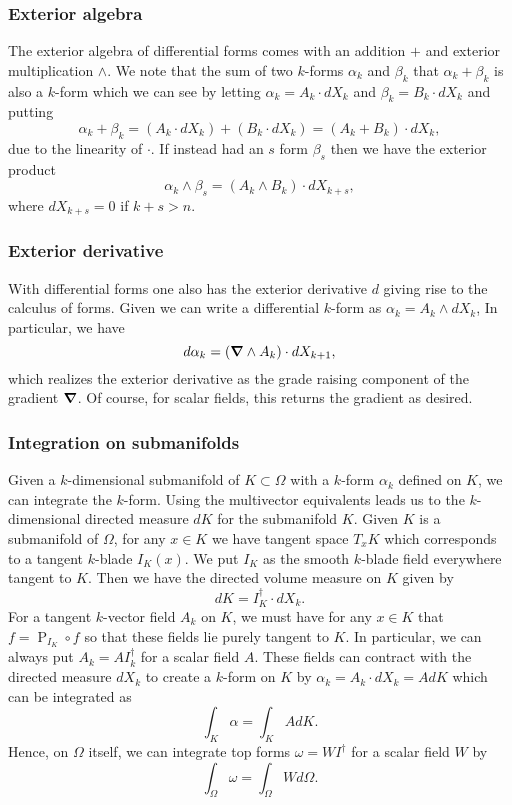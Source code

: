 \subsubsection{Exterior algebra}
The exterior algebra of differential forms comes with an addition $+$ and exterior multiplication $\wedge$.  We note that the sum of two $k$-forms $\alpha_k$ and $\beta_k$ that $\alpha_k+\beta_k$ is also a $k$-form which we can see by letting $\alpha_k = A_k \cdot dX_k$ and $\beta_k = B_k \cdot dX_k$ and putting
\[
\alpha_k + \beta_k = (A_k \cdot dX_k)+(B_k \cdot dX_k) = (A_k + B_k) \cdot dX_k,
\]
due to the linearity of $\cdot$.  If instead had an $s$ form $\beta_s$ then we have the exterior product
\[
\alpha_k \wedge \beta_s = (A_k \wedge B_k) \cdot dX_{k+s},
\]
where $dX_{k+s}=0$ if $k+s>n$.  


\subsubsection{Exterior derivative}
With differential forms one also has the exterior derivative $d$ giving rise to the calculus of forms.  Given we can write a differential $k$-form as $\alpha_k = A_k \wedge dX_k$,  In particular, we have
\[
d \alpha_k = (\boldsymbol{\nabla} \wedge A_k) \cdot dX_{k+1},
\]
which realizes the exterior derivative as the grade raising component of the gradient $\boldsymbol{\nabla}$. Of course, for scalar fields, this returns the gradient as desired. 


\subsubsection{Integration on submanifolds}

Given a $k$-dimensional submanifold of $K \subset \Omega$ with a $k$-form $\alpha_k$ defined on $K$, we can integrate the $k$-form. Using the multivector equivalents leads us to the $k$-dimensional directed measure $dK$ for the submanifold $K$.  Given $K$ is a submanifold of $\Omega$, for any $x \in K$ we have tangent space $T_x K$ which corresponds to a tangent $k$-blade $I_K(x)$.  We put $I_K$ as the smooth $k$-blade field everywhere tangent to $K$. Then we have the directed volume measure on $K$ given by
\[
dK = I_K^\dagger \cdot dX_k.
\]
For a tangent $k$-vector field $A_k$ on $K$, we must have for any $x \in K$ that $f = \operatorname{P}_{I_K} \circ f$ so that these fields lie purely tangent to $K$. In particular, we can always put $A_k = A I_k^\dagger$ for a scalar field $A$. These fields can contract with the directed measure $dX_k$ to create a $k$-form on $K$ by $\alpha_k = A_k \cdot dX_k = A dK$ which can be integrated as
\[
\int_K \alpha = \int_K A dK.
\]
Hence, on $\Omega$ itself, we can integrate top forms $\omega = W I^\dagger$ for a scalar field $W$ by
\[
\int_\Omega \omega = \int_\Omega W d\Omega.
\]

